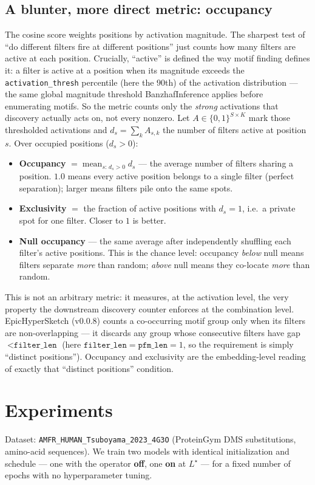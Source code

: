 \documentclass[11pt]{article}
\begin{document}
\subsection{A blunter, more direct metric: occupancy}
\label{sec:occ}
The cosine score weights positions by activation magnitude. The sharpest test of ``do
different filters fire at different positions'' just counts how many filters are active at each
position. Crucially, ``active'' is defined the way motif finding defines it: a filter is active
at a position when its magnitude exceeds the \texttt{activation\_thresh} percentile (here the
$90$th) of the activation distribution --- the same global magnitude threshold
BanzhafInference applies before enumerating motifs. So the metric counts only the
\emph{strong} activations that discovery actually acts on, not every nonzero. Let
$A\in\{0,1\}^{S\times K}$ mark those thresholded activations and $d_s=\sum_k A_{s,k}$ the number
of filters active at position $s$. Over occupied positions ($d_s>0$):
\begin{itemize}
\item \textbf{Occupancy} $=\operatorname{mean}_{s:\,d_s>0} d_s$ --- the average number of
filters sharing a position. $1.0$ means every active position belongs to a single filter
(perfect separation); larger means filters pile onto the same spots.
\item \textbf{Exclusivity} $=$ the fraction of active positions with $d_s=1$, i.e.\ a private
spot for one filter. Closer to $1$ is better.
\item \textbf{Null occupancy} --- the same average after independently shuffling each filter's
active positions. This is the chance level: occupancy \emph{below} null means filters separate
\emph{more} than random; \emph{above} null means they co-locate \emph{more} than random.
\end{itemize}
This is not an arbitrary metric: it measures, at the activation level, the very property the
downstream discovery counter enforces at the combination level. EpicHyperSketch (v0.0.8) counts a
co-occurring motif group only when its filters are non-overlapping --- it discards any group whose
consecutive filters have gap $<\texttt{filter\_len}$ (here $\texttt{filter\_len}=\texttt{pfm\_len}=1$,
so the requirement is simply ``distinct positions''). Occupancy and exclusivity are the
embedding-level reading of exactly that ``distinct positions'' condition.

\section{Experiments}
\label{sec:exp}
Dataset: \texttt{AMFR\_HUMAN\_Tsuboyama\_2023\_4G3O} (ProteinGym DMS substitutions,
amino-acid sequences). We train two models with identical initialization and schedule ---
one with the operator \textbf{off}, one \textbf{on} at $L^\star$ --- for a fixed number of
epochs with no hyperparameter tuning.
\end{document}
